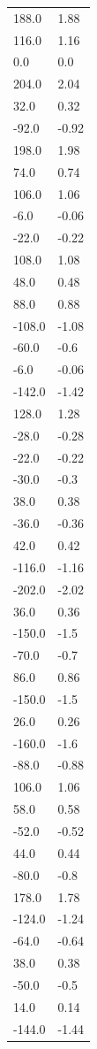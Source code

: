 \begin{longtable}{ll}
188.0 & 1.88 \\
116.0 & 1.16 \\
0.0 & 0.0 \\
204.0 & 2.04 \\
32.0 & 0.32 \\
-92.0 & -0.92 \\
198.0 & 1.98 \\
74.0 & 0.74 \\
106.0 & 1.06 \\
-6.0 & -0.06 \\
-22.0 & -0.22 \\
108.0 & 1.08 \\
48.0 & 0.48 \\
88.0 & 0.88 \\
-108.0 & -1.08 \\
-60.0 & -0.6 \\
-6.0 & -0.06 \\
-142.0 & -1.42 \\
128.0 & 1.28 \\
-28.0 & -0.28 \\
-22.0 & -0.22 \\
-30.0 & -0.3 \\
38.0 & 0.38 \\
-36.0 & -0.36 \\
42.0 & 0.42 \\
-116.0 & -1.16 \\
-202.0 & -2.02 \\
36.0 & 0.36 \\
-150.0 & -1.5 \\
-70.0 & -0.7 \\
86.0 & 0.86 \\
-150.0 & -1.5 \\
26.0 & 0.26 \\
-160.0 & -1.6 \\
-88.0 & -0.88 \\
106.0 & 1.06 \\
58.0 & 0.58 \\
-52.0 & -0.52 \\
44.0 & 0.44 \\
-80.0 & -0.8 \\
178.0 & 1.78 \\
-124.0 & -1.24 \\
-64.0 & -0.64 \\
38.0 & 0.38 \\
-50.0 & -0.5 \\
14.0 & 0.14 \\
-144.0 & -1.44 \\

\end{longtable}
